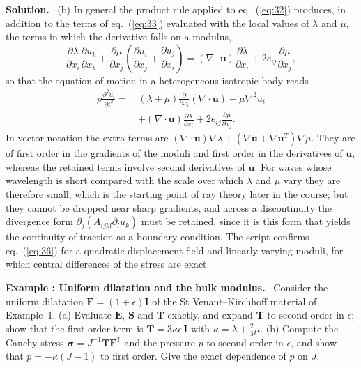 \documentclass[a4paper,12pt]{paper}
\newcounter{example}
\renewenvironment{example}[1]{%
  \refstepcounter{example}%
  \begin{mdframed}[linewidth=1pt,innertopmargin=6pt,innerbottommargin=6pt]%
  \noindent\textbf{Example \theexample: #1.}\ }{%
  \end{mdframed}}
\newenvironment{solution}{\par\noindent\textbf{Solution.}\ }{\par\medskip}
\begin{document}
\begin{solution}
(b) In general the product rule applied to eq.~(\ref{eq:32}) produces, in addition to the
terms of eq.~(\ref{eq:33}) evaluated with the local values of $\lambda$ and $\mu$, the terms
in which the derivative falls on a modulus,
\begin{equation}
\frac{\partial\lambda}{\partial x_{i}}\frac{\partial u_{k}}{\partial x_{k}}
+\frac{\partial\mu}{\partial x_{j}}\left(\frac{\partial u_{i}}{\partial x_{j}}+\frac{\partial u_{j}}{\partial x_{i}}\right)
=(\nabla\cdot\mathbf{u})\frac{\partial\lambda}{\partial x_{i}}+2e_{ij}\frac{\partial\mu}{\partial x_{j}},
\label{eq:35}
\end{equation}
so that the equation of motion in a heterogeneous isotropic body reads
\begin{equation}
\begin{split}
\rho\frac{\partial^{2}u_{i}}{\partial t^{2}}=\,&(\lambda+\mu)\frac{\partial}{\partial x_{i}}(\nabla\cdot\mathbf{u})+\mu\nabla^{2}u_{i}\\
&+(\nabla\cdot\mathbf{u})\frac{\partial\lambda}{\partial x_{i}}+2e_{ij}\frac{\partial\mu}{\partial x_{j}}.
\end{split}
\label{eq:36}
\end{equation}
In vector notation the extra terms are $(\nabla\cdot\mathbf{u})\nabla\lambda+(\nabla\mathbf{u}+\nabla\mathbf{u}^{T})\nabla\mu$.
They are of first order in the gradients of the moduli and first order in the derivatives of
$\mathbf{u}$, whereas the retained terms involve second derivatives of $\mathbf{u}$. For waves whose
wavelength is short compared with the scale over which $\lambda$ and $\mu$ vary they are
therefore small, which is the starting point of ray theory later in the course; but they cannot be
dropped near sharp gradients, and across a discontinuity the divergence form
$\partial_{j}(A_{ijkl}\partial_{l}u_{k})$ must be retained, since it is this form that yields the
continuity of traction as a boundary condition. The script confirms eq.~(\ref{eq:36})
for a quadratic displacement field and linearly varying moduli, for which central differences
of the stress are exact.
\end{solution}

\begin{example}{Uniform dilatation and the bulk modulus}
Consider the uniform dilatation $\mathbf{F}=(1+\epsilon)\mathbf{I}$ of the St Venant--Kirchhoff
material of Example~1. (a) Evaluate $\mathbf{E}$, $\mathbf{S}$ and $\mathbf{T}$ exactly,
and expand $\mathbf{T}$ to second order in $\epsilon$; show that the first-order term is
$\mathbf{T}=3\kappa\epsilon\,\mathbf{I}$ with $\kappa=\lambda+\frac{2}{3}\mu$. (b) Compute the Cauchy
stress $\bm{\sigma}=J^{-1}\mathbf{T}\mathbf{F}^{T}$ and the pressure $p$ to second order in $\epsilon$,
and show that $p=-\kappa(J-1)$ to first order. Give the exact dependence of $p$ on $J$.
\end{example}
\end{document}
